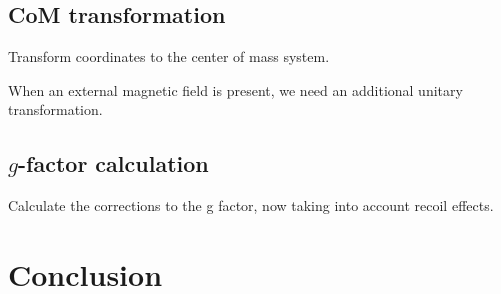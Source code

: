 \documentclass[12pt]{article}
\begin{document}
\subsection{CoM transformation}
Transform coordinates to the center of mass system.

When an external magnetic field is present, we need an additional unitary transformation.

\subsection{$g$-factor calculation}

Calculate the corrections to the g factor, now taking into account recoil effects.


\section{Conclusion}
\end{document}
